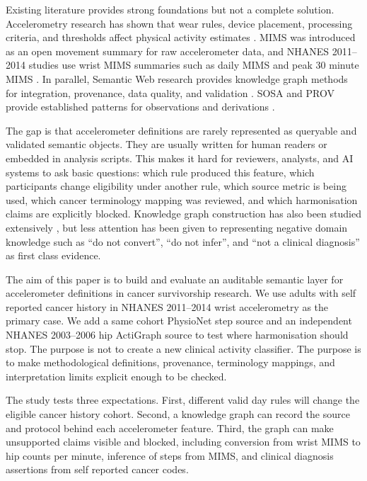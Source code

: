\documentclass[final,5p,times,twocolumn]{elsarticle}
\begin{document}
Existing literature provides strong foundations but not a complete solution. Accelerometry research has shown that wear rules, device placement, processing criteria, and thresholds affect physical activity estimates \cite{troiano2008physical,freedson1998calibration,migueles2017accelerometer}. MIMS was introduced as an open movement summary for raw accelerometer data, and NHANES 2011--2014 studies use wrist MIMS summaries such as daily MIMS and peak 30 minute MIMS \cite{john2019mims,zheng2023mims,saelee2021percentiles}. In parallel, Semantic Web research provides knowledge graph methods for integration, provenance, data quality, and validation \cite{hogan2021knowledge,ji2022survey,noy2019industry,zaveri2016quality}. SOSA and PROV provide established patterns for observations and derivations \cite{janowicz2019sosa,moreau2015prov}.

The gap is that accelerometer definitions are rarely represented as queryable and validated semantic objects. They are usually written for human readers or embedded in analysis scripts. This makes it hard for reviewers, analysts, and AI systems to ask basic questions: which rule produced this feature, which participants change eligibility under another rule, which source metric is being used, which cancer terminology mapping was reviewed, and which harmonisation claims are explicitly blocked. Knowledge graph construction has also been studied extensively \cite{paulheim2017refinement,ristoski2016semantic}, but less attention has been given to representing negative domain knowledge such as ``do not convert'', ``do not infer'', and ``not a clinical diagnosis'' as first class evidence.

The aim of this paper is to build and evaluate an auditable semantic layer for accelerometer definitions in cancer survivorship research. We use adults with self reported cancer history in NHANES 2011--2014 wrist accelerometry as the primary case. We add a same cohort PhysioNet step source and an independent NHANES 2003--2006 hip ActiGraph source to test where harmonisation should stop. The purpose is not to create a new clinical activity classifier. The purpose is to make methodological definitions, provenance, terminology mappings, and interpretation limits explicit enough to be checked.

The study tests three expectations. First, different valid day rules will change the eligible cancer history cohort. Second, a knowledge graph can record the source and protocol behind each accelerometer feature. Third, the graph can make unsupported claims visible and blocked, including conversion from wrist MIMS to hip counts per minute, inference of steps from MIMS, and clinical diagnosis assertions from self reported cancer codes.
\end{document}
